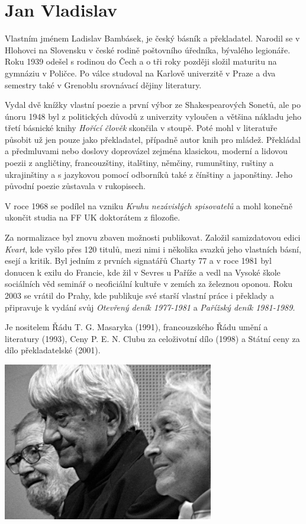 \section{Jan Vladislav}

\noindent
Vlastním jménem Ladislav Bambásek, je český básník a překladatel. Narodil se v Hlohovci na Slovensku v české rodině poštovního úředníka, bývalého legionáře. Roku 1939 odešel s rodinou do Čech a o tři roky později složil maturitu na gymnáziu v Poličce. Po válce studoval na Karlově univerzitě v Praze a dva semestry také v Grenoblu srovnávací dějiny literatury.

Vydal dvě knížky vlastní poezie a první výbor ze Shakespearových Sonetů, ale po únoru 1948 byl z politických důvodů z univerzity vyloučen a většina nákladu jeho třetí básnické knihy \textit{Hořící člověk} skončila v stoupě. Poté mohl v literatuře působit už jen pouze jako překladatel, případně autor knih pro mládež. Překládal a předmluvami nebo doslovy doprovázel zejména klasickou, moderní a lidovou poezii z angličtiny, francouzštiny, italštiny, němčiny, rumunštiny, ruštiny a ukrajinštiny a s jazykovou pomocí odborníků také z čínštiny a japonštiny. Jeho původní poezie zůstavala v rukopisech.

V roce 1968 se podílel na vzniku \textit{Kruhu nezávislých spisovatelů} a mohl konečně ukončit studia na FF UK doktorátem z filozofie.

Za normalizace byl znovu zbaven možnosti publikovat. Založil samizdatovou edici \textit{Kvart}, kde vyšlo přes 120 titulů, mezi nimi i několika svazků jeho vlastních básní, esejí a kritik. Byl jedním z prvních signatářů Charty 77 a v roce 1981 byl donucen k exilu do Francie, kde žil v Sevres u Paříže a vedl na Vysoké škole sociálních věd seminář o neoficiální kultuře v zemích za železnou oponou. Roku 2003 se vrátil do Prahy, kde publikuje své starší vlastní práce i překlady a připravuje k vydání svůj \textit{Otevřený deník 1977-1981} a \textit{Pařížský deník 1981-1989}.

Je nositelem Řádu T. G. Masaryka (1991), francouzského Řádu umění a literatury (1993), Ceny P. E. N. Clubu za celoživotní dílo (1998) a Státní ceny za dílo překladatelské (2001).


\begin{center}
 \includegraphics[width=9.2cm]{plavrevue-40/img/vl1.jpg}
\end{center}
